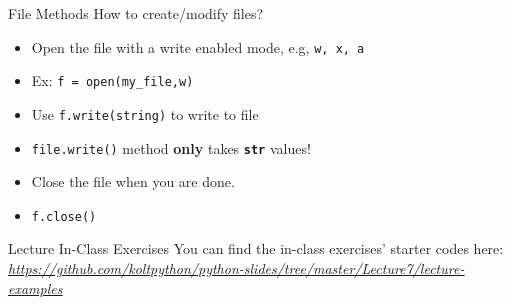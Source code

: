     \begin{frame}{File Methods}
        \LARGE
        How to create/modify files?
        \begin{itemize}
            \item Open the file with a write enabled mode, e.g, \texttt{w, x, a}
            \pause
            \item Ex: \texttt{f = open(\textquotesingle my\_file\textquotesingle ,\textquotesingle w\textquotesingle )}
            \pause
            \item Use \texttt{f.write(string)} to write to file
            \pause
            \item \texttt{file.write()} method \textbf{only} takes \texttt{\textbf{str}} values!
            \pause
            \item Close the file when you are done.
            \pause
            \item \texttt{f.close()}
        \end{itemize}
    \end{frame}

    \begin{frame}{Lecture In-Class Exercises}
        \large
        You can find the in-class exercises' starter codes here:
        \normalsize
        \href{http://tiny.cc/kolt-hackathon}{\underline{\textit{https://github.com/koltpython/python-slides/tree/master/Lecture7/lecture-examples}}}
    \end{frame}


